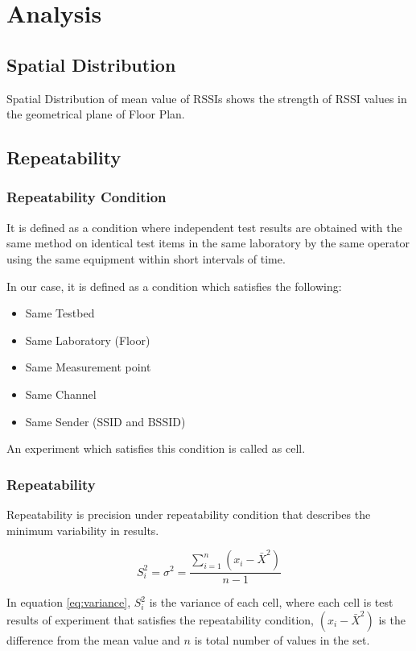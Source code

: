 \documentclass[11pt,a4paper,headinclude,footinclude,chapterprefix=on]{scrreprt}
\begin{document}
\chapter{Analysis}
\section{Spatial Distribution}
Spatial Distribution of mean value of RSSIs shows the strength of RSSI values in the geometrical plane of Floor Plan.

\section{Repeatability}
\subsection{Repeatability Condition}
It is defined as a condition where independent test results are obtained with the same method on identical test items in the same laboratory by the same operator using the same equipment within short intervals of time.

In our case, it is defined as a condition which satisfies the following:
\begin{itemize}
\item Same Testbed
\item Same Laboratory (Floor)
\item Same Measurement point
\item Same Channel
\item Same Sender (SSID and BSSID)
\end{itemize}

An experiment which satisfies this condition is called as cell. 

\subsection{Repeatability}
Repeatability is precision under repeatability condition that describes the minimum variability in results.

\begin{equation}\label{eq:variance}
{S}_i^2 = {\sigma}^2 =  \frac{\sum\limits_{i=1}^{n} (x_{i} - \bar{X}^2)}{n-1}
\end{equation}

In equation \ref{eq:variance},
 $S_{i}^{2}$ is the variance of each cell, where each cell is test results of experiment that satisfies the repeatability condition, $(x_{i} - \bar{X}^2)$ is the difference from the mean value and $n$ is total number of values in the set.
\end{document}
